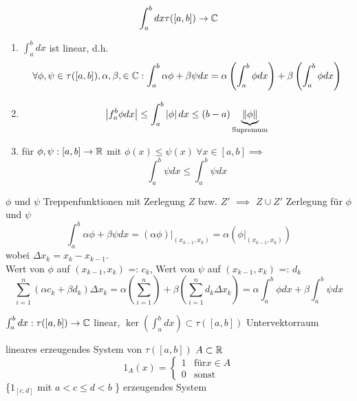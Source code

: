 \begin{Lem}{}
  \begin{align*}
    \int_a^b dx \tau([a,b])\to\mathbb{C}
  \end{align*}
  \begin{enumerate}
    \item $\int_a^b dx$ ist linear, d.h.
      \[\forall \phi, \psi\in\tau([a,b]),\alpha, \beta, \in\mathbb{C}: \int_a^b\alpha\phi+\beta\psi dx = \alpha\left( \int^b_a\phi dx \right)+\beta\left( \int^b_a\phi dx \right)\]
    \item \[\left| f^b_a\phi dx \right|\leq \int^b_a\left| \phi \right| dx \leq (b-a) \underbrace{\left\| \phi \right\|}_{\text{Supremum}}\]
    \item für $\phi,\psi:[a,b]\to\mathbb{R}$ mit $\phi(x)\leq\psi(x)\ \forall x\in[a,b] \implies$
      \[\int^b_a\psi dx \leq \int^b_a \psi dx\]
  \end{enumerate}
\end{Lem}
\begin{Bew}
  $\phi$ und $\psi$ Treppenfunktionen mit Zerlegung $Z$ bzw. $Z'$ $\implies$ $Z\cup Z'$ Zerlegung für $\phi$ und $\psi$
  \[\int^b_a\alpha\phi+\beta\psi dx = (\alpha\phi)|_{(x_{k-1},x_k)}=\alpha(\phi|_{(x_{k-1},x_k)})\]
  wobei $\Delta x_k=x_k-x_{k-1}$.\\
  Wert von $\phi$ auf $(x_{k-1},x_k)$ =: $c_k$, Wert von $\psi$ auf $(x_{k-1},x_k)$ =: $d_k$
  \[\sum^n_{i=1}(\alpha c_k+\beta d_k)\Delta x_k=\alpha(\sum^n_{i=1})+\beta(\sum^n_{i=1}d_k\Delta x_k)=\alpha\int^b_a \phi dx+\beta \int^b_a \psi dx\]
\end{Bew}
\begin{Bem}
  $\int^b_a dx: \tau([a,b])\to\mathbb{C}$ linear, $\ker(\int_a^b dx) \subset \tau([a,b])$ Untervektorraum
\end{Bem}
\begin{Bem}
  lineares erzeugendes System von $\tau([a,b])$ $A\subset\mathbb{R}$
  \[1_A(x) = \begin{cases}1&\text{für} x\in A\\0&\text{sonst}\end{cases}\]
  \{$1_{[c,d]}$ mit $a<c\leq d<b$ \} erzeugendes System
\end{Bem}
